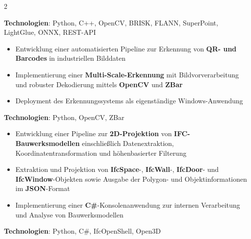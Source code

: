 \documentclass[10pt,a4paper,withhyper]{../altacv}
\begin{document}
\begin{paracol}{2}
  \vspace{0.5em}

  \textbf{Technologien}: Python, C++, OpenCV, BRISK, FLANN, SuperPoint, LightGlue, ONNX, REST-API

  \vspace{0.5em}

  \newpage

  \vspace{0.5em}

  \begin{itemize}
    \item Entwicklung einer automatisierten Pipeline zur Erkennung von \textbf{QR- und Barcodes} in industriellen Bilddaten
    \item Implementierung einer \textbf{Multi-Scale-Erkennung} mit Bildvorverarbeitung und robuster Dekodierung mittels \textbf{OpenCV} und \textbf{ZBar}
    \item Deployment des Erkennungssystems als eigenständige Windows-Anwendung
  \end{itemize}

  \vspace{0.5em}

  \textbf{Technologien}: Python, OpenCV, ZBar

  \vspace{0.5em}


  \vspace{0.5em}

  \begin{itemize}
    \item Entwicklung einer Pipeline zur \textbf{2D-Projektion} von \textbf{IFC-Bauwerksmodellen} einschließlich Datenextraktion, Koordinatentransformation und höhenbasierter Filterung
    \item Extraktion und Projektion von \textbf{IfcSpace}-, \textbf{IfcWall}-, \textbf{IfcDoor}- und \textbf{IfcWindow}-Objekten sowie Ausgabe der Polygon- und Objektinformationen im \textbf{JSON}-Format
    \item Implementierung einer \textbf{C\#}-Konsolenanwendung zur internen Verarbeitung und Analyse von Bauwerksmodellen
  \end{itemize}

  \vspace{0.5em}

  \textbf{Technologien}: Python, C\#, IfcOpenShell, Open3D


\end{paracol}
\end{document}
